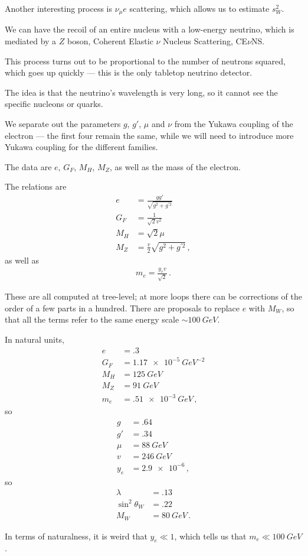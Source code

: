 \documentclass[main.tex]{subfiles}
\begin{document}
Another interesting process is \(\nu _\mu e\) scattering, which allows us to estimate \(s_W^2\). 

We can have the recoil of an entire nucleus with a low-energy neutrino, which is mediated by a \(Z\) boson, Coherent Elastic \(\nu \) Nucleus Scattering, CE\(\nu \)NS. 

This process turns out to be proportional to the number of neutrons squared, which goes up quickly --- this is the only tabletop neutrino detector. 

The idea is that the neutrino's wavelength is very long, so it cannot see the specific nucleons or quarks. 

We separate out the parameters \(g\), \(g'\), \(\mu \) and \(\nu \) from the Yukawa coupling of the electron --- the first four remain the same, while we will need to introduce more Yukawa coupling for the different families. 

The data are \(e\), \(G_F\), \(M_H\), \(M_Z\), as well as the mass of the electron. 

The relations are 
%
\begin{align}
e &= \frac{gg'}{\sqrt{g^2 + g^{\prime 2}}}  \\
G_F &= \frac{1}{\sqrt{2} v^2} \\
M_H &= \sqrt{2} \mu  \\
M_Z &= \frac{v}{2} \sqrt{g^2  + g^{\prime 2}}
\,,
\end{align}
%
as well as 
%
\begin{align}
m_e = \frac{y_e v}{\sqrt{2}}
\,.
\end{align}

These are all computed at tree-level; at more loops there can be corrections of the order of a few parts in a hundred. 
There are proposals to replace \(e\) with \(M_W\), so that all the terms refer to the same energy scale \(\sim \SI{100}{GeV}\). 

In natural units, 
%
\begin{align}
e &= \num{.3}  \\
G_F &= \SI{1.17e-5}{GeV^{-2}}  \\
M_H &= \SI{125}{GeV} \\
M_Z &= \SI{91}{GeV} \\
m_e &= \SI{.51e-3}{GeV}
\,,
\end{align}
%
so 
%
\begin{align}
g &= \num{.64}  \\
g' &= \num{.34}  \\
\mu &= \SI{88}{GeV}  \\
v &= \SI{246}{GeV}  \\
y_e &= \num{2.9e-6} 
\,,
\end{align}
%
so 
%
\begin{align}
\lambda &= \num{.13}  \\
\sin^2 \theta_W &= \num{.22}  \\
M_W &= \SI{80}{GeV}
\,.
\end{align}

In terms of naturalness, it is weird that \(y_e \ll 1\), which tells us that \(m_e \ll \SI{100}{GeV}\). 
\end{document}
